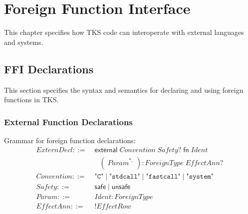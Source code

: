 \chapter{Foreign Function Interface}
\label{ch:ffi}

\begin{tcolorbox}[colback=blue!5!white,colframe=blue!75!black,title=\vnewthree]
This chapter specifies how TKS code can interoperate with external languages and systems.
\end{tcolorbox}

\section{FFI Declarations}
\label{sec:ffi-declarations}

This section specifies the syntax and semantics for declaring and using foreign functions in TKS.

\subsection{External Function Declarations}
\label{subsec:external-declarations}

\begin{definition}
\label{def:external-syntax}
Grammar for foreign function declarations:
\begin{align}
\mathit{ExternDecl} ::=&\; \mathsf{external}\; \mathit{Convention}\; \mathit{Safety}?\; \mathsf{fn}\; \mathit{Ident} \\
    &\quad (\; \mathit{Param}^{*,}\; ) : \mathit{ForeignType}\; \mathit{EffectAnn}? \\
\mathit{Convention} ::=&\; \texttt{"C"} \mid \texttt{"stdcall"} \mid \texttt{"fastcall"} \mid \texttt{"system"} \\
\mathit{Safety} ::=&\; \mathsf{safe} \mid \mathsf{unsafe} \\
\mathit{Param} ::=&\; \mathit{Ident} : \mathit{ForeignType} \\
\mathit{EffectAnn} ::=&\; \mathbin{!} \mathit{EffectRow}
\end{align}
\end{definition}

